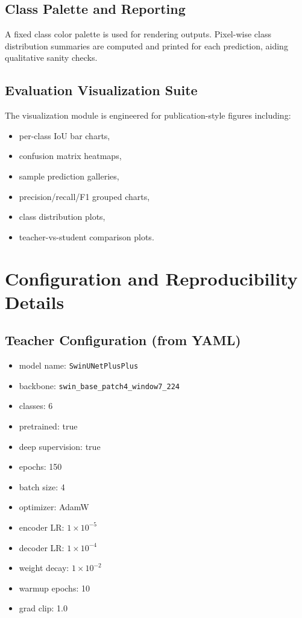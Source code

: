 \documentclass[journal]{IEEEtran}
\begin{document}
\subsection{Class Palette and Reporting}
A fixed class color palette is used for rendering outputs. Pixel-wise class distribution summaries are computed and printed for each prediction, aiding qualitative sanity checks.

\subsection{Evaluation Visualization Suite}
The visualization module is engineered for publication-style figures including:
\begin{itemize}
    \item per-class IoU bar charts,
    \item confusion matrix heatmaps,
    \item sample prediction galleries,
    \item precision/recall/F1 grouped charts,
    \item class distribution plots,
    \item teacher-vs-student comparison plots.
\end{itemize}

\section{Configuration and Reproducibility Details}
\subsection{Teacher Configuration (from YAML)}
\begin{itemize}
    \item model name: \texttt{SwinUNetPlusPlus}
    \item backbone: \texttt{swin\_base\_patch4\_window7\_224}
    \item classes: 6
    \item pretrained: true
    \item deep supervision: true
    \item epochs: 150
    \item batch size: 4
    \item optimizer: AdamW
    \item encoder LR: $1\times10^{-5}$
    \item decoder LR: $1\times10^{-4}$
    \item weight decay: $1\times10^{-2}$
    \item warmup epochs: 10
    \item grad clip: 1.0
\end{itemize}
\end{document}
